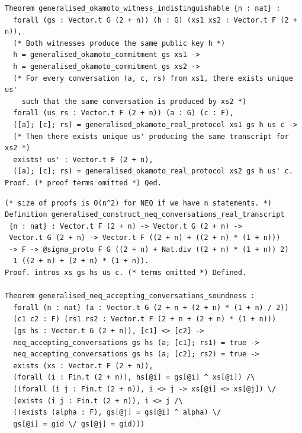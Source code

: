 \documentclass[sigconf,anonymous,review]{acmart}
\begin{document}
\begin{lstlisting}[frame=single, language=Coq, caption={Witness Indistinguishability},
label={wit_ind},captionpos=t, basicstyle=\ttfamily\footnotesize,
abovecaptionskip=-\medskipamount]
Theorem generalised_okamoto_witness_indistinguishable {n : nat} :
  forall (gs : Vector.t G (2 + n)) (h : G) (xs1 xs2 : Vector.t F (2 + n)),
  (* Both witnesses produce the same public key h *)
  h = generalised_okamoto_commitment gs xs1 ->
  h = generalised_okamoto_commitment gs xs2 ->
  (* For every conversation (a, c, rs) from xs1, there exists unique us' 
    such that the same conversation is produced by xs2 *)
  forall (us rs : Vector.t F (2 + n)) (a : G) (c : F),
  ([a]; [c]; rs) = generalised_okamoto_real_protocol xs1 gs h us c ->
  (* Then there exists unique us' producing the same transcript for xs2 *)
  exists! us' : Vector.t F (2 + n),
  ([a]; [c]; rs) = generalised_okamoto_real_protocol xs2 gs h us' c.
Proof. (* proof terms omitted *) Qed.
\end{lstlisting}

\begin{lstlisting}[frame=single, language=Coq, caption={Neq $\Sigma$ Protocol},
label={neq_special_sound},captionpos=t, basicstyle=\ttfamily\footnotesize,
abovecaptionskip=-\medskipamount]
(* size of proofs is O(n^2) for NEQ if we have n statements. *) 
Definition generalised_construct_neq_conversations_real_transcript 
 {n : nat} : Vector.t F (2 + n) -> Vector.t G (2 + n) -> 
 Vector.t G (2 + n) -> Vector.t F ((2 + n) + ((2 + n) * (1 + n))) 
 -> F -> @sigma_proto F G ((2 + n) + Nat.div ((2 + n) * (1 + n)) 2) 
  1 ((2 + n) + (2 + n) * (1 + n)).
Proof. intros xs gs hs us c. (* terms omitted *) Defined. 

Theorem generalised_neq_accepting_conversations_soundness :
  forall (n : nat) (a : Vector.t G (2 + n + (2 + n) * (1 + n) / 2)) 
  (c1 c2 : F) (rs1 rs2 : Vector.t F (2 + n + (2 + n) * (1 + n))) 
  (gs hs : Vector.t G (2 + n)), [c1] <> [c2] ->
  neq_accepting_conversations gs hs (a; [c1]; rs1) = true ->
  neq_accepting_conversations gs hs (a; [c2]; rs2) = true ->
  exists (xs : Vector.t F (2 + n)), 
  (forall (i : Fin.t (2 + n)), hs[@i] = gs[@i] ^ xs[@i]) /\
  ((forall (i j : Fin.t (2 + n)), i <> j -> xs[@i] <> xs[@j]) \/
  (exists (i j : Fin.t (2 + n)), i <> j /\ 
  ((exists (alpha : F), gs[@j] = gs[@i] ^ alpha) \/ 
  gs[@i] = gid \/ gs[@j] = gid)))
\end{lstlisting}
\end{document}

